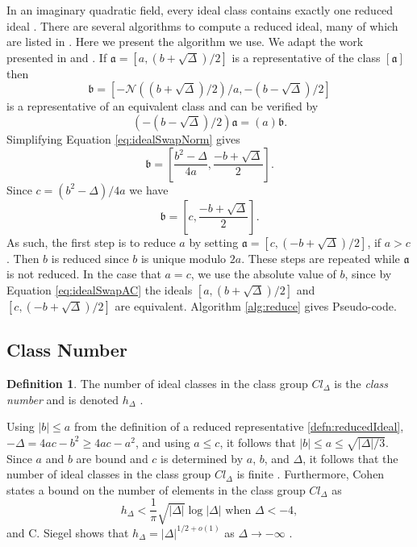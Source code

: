 \documentclass{ucalgthes1}
\theoremstyle{definition}
\newtheorem{defn}[thm]{Definition}
\newcommand{\ideal}{\mathfrak}
\newcommand{\idealclass}[1]{\left[ \ideal #1 \right]}
\newcommand{\aclass}{\idealclass a}
\begin{document}
In an imaginary quadratic field, every ideal class contains exactly one reduced ideal \cite[p.20]{Ramachandran2006}.  There are several algorithms to compute a reduced ideal, many of which are listed in \cite{Jacobson2006}.  Here we present the algorithm we use.  We adapt the work presented in \cite[p.90]{Jacobson2006} and \cite[p.99]{Jacobson2009}. If $\ideal a = [a, (b + \sqrt\Delta)/2]$ is a representative of the class $\aclass$ then
\begin{equation}
\label{eq:idealSwapNorm}
	\ideal b = \left[ -\mathcal N((b + \sqrt\Delta)/2)/a, -(b - \sqrt\Delta)/2 \right]
\end{equation}
is a representative of an equivalent class and can be verified by
\[
	\left(-(b - \sqrt\Delta)/2 \right) \ideal a = (a) \ideal b.
\]
Simplifying Equation \ref{eq:idealSwapNorm} gives
\[
	\ideal b = \left[ \frac{b^2-\Delta}{4a}, \frac{-b + \sqrt\Delta}{2} \right].
\]
Since $c = (b^2 - \Delta)/4a$ we have
\begin{equation}
\label{eq:idealSwapAC}
	\ideal b = \left[ c, \frac{-b + \sqrt\Delta}{2} \right].
\end{equation}
As such, the first step is to reduce $a$ by setting $\ideal a = [c, (-b + \sqrt\Delta)/2]$, if $a > c$.  Then $b$ is reduced since $b$ is unique modulo $2a$.  These steps are repeated while $\ideal a$ is not reduced. In the case that $a = c$, we use the absolute value of $b$, since by Equation \ref{eq:idealSwapAC} the ideals $[a, (b + \sqrt\Delta)/2]$ and $[c, (-b+\sqrt\Delta)/2]$ are equivalent.  Algorithm \ref{alg:reduce} gives Pseudo-code.

\subsection{Class Number}
\label{subsec:classNumber}

\begin{defn}
The number of ideal classes in the class group $Cl_\Delta$ is the \emph{class number} and is denoted $h_\Delta$ \cite[p.153]{Jacobson2009}.
\end{defn}

Using $|b| \le a$ from the definition of a reduced representative \ref{defn:reducedIdeal}, $-\Delta = 4ac - b^2 \ge 4ac -a^2$, and using $a \le c$, it follows that $|b| \le a \le \sqrt{|\Delta|/3}$.  Since $a$ and $b$ are bound and $c$ is determined by $a$, $b$, and $\Delta$, it follows that the number of ideal classes in the class group $Cl_\Delta$ is finite \cite[p.153]{Jacobson2009}.  Furthermore, Cohen \cite[p.247]{Crandall2001} states a bound on the number of elements in the class group $Cl_\Delta$ as
\begin{equation}
\label{eq:hDelta}
	h_\Delta < \frac{1}{\pi} \sqrt{|\Delta|}\log{|\Delta|} \textrm{ when } \Delta < -4,
\end{equation}
and C. Siegel shows that $h_\Delta = |\Delta|^{1/2 + o(1)}$ as $\Delta \rightarrow -\infty$ \cite[p.247]{Crandall2001}.
\end{document}
